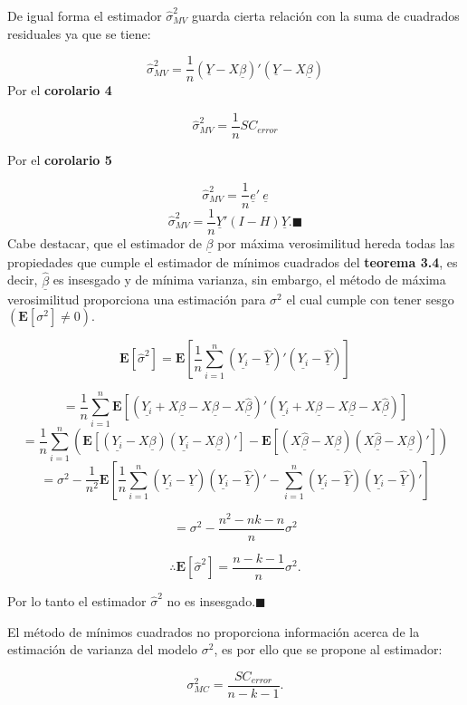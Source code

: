 \documentclass[
  a4paper,
  oneside,
  openany]{book}
\begin{document}
De igual forma el estimador \(\hat{\sigma}^2_{MV}\) guarda cierta relación con la suma de cuadrados residuales ya que se tiene:

\[\hat{\sigma}^2_{MV}=\frac{1}{n}(\underline{Y}-X\underline{\beta})'(\underline{Y}-X\underline{\beta})\]
Por el \textbf{corolario 4}

\[\hat{\sigma}^2_{MV}=\frac{1}{n}SC_{error}\]

Por el \textbf{corolario 5}

\[\hat{\sigma}^2_{MV}=\frac{1}{n}\underline{e}' \ \underline{e}\]
\[\hat{\sigma}^2_{MV}=\frac{1}{n}\underline{Y}'(I-H)\underline{Y}. \blacksquare \]
Cabe destacar, que el estimador de \(\underline{\beta}\) por máxima verosimilitud hereda todas las propiedades que cumple el estimador de mínimos cuadrados del \textbf{teorema 3.4}, es decir, \(\underline{\hat{\beta}}\) es insesgado y de mínima varianza, sin embargo, el método de máxima verosimilitud proporciona una estimación para \(\sigma^2\) el cual cumple con tener sesgo \((\mathbf{E}[\sigma^2]\neq 0).\)

\[\mathbf{E}[\hat{\sigma}^2]=\mathbf{E}\left[\frac{1}{n}\sum_{i=1}^{n}(\underline{Y_{i}}-\underline{\hat{Y}})'(\underline{Y_{i}}-\underline{\hat{Y}}) \right]\]

\[=\frac{1}{n}\sum_{i=1}^{n}\mathbf{E}\left[(\underline{Y_{i}}+X\underline{\beta}-X\underline{\beta}-X\underline{\hat{\beta}})'(\underline{Y_{i}}+X\underline{\beta}-X\underline{\beta}-X\underline{\hat{\beta}}) \right]\]
\[=\frac{1}{n}\sum_{i=1}^{n}\left(\mathbf{E}[(\underline{Y_{i}}-X\underline{\beta})(\underline{Y_{i}}-X\underline{\beta})']-\mathbf{E}\left[(X\underline{\hat{\beta}}-X\underline{\beta})(X\underline{\hat{\beta}}-X\underline{\beta})'\right] \right)\]
\[=\sigma^2-\frac{1}{n^2}\mathbf{E}\left[\frac{1}{n}\sum_{i=1}^{n}(\underline{Y_{i}}-\underline{\hat{Y}})(\underline{Y_{i}}-\underline{\hat{Y}})'-\sum_{i=1}^{n}(\underline{Y_{i}}-\underline{\hat{Y}})(\underline{Y_{i}}-\underline{\hat{Y}})'\right]\]

\[=\sigma^2-\frac{n^2-nk-n}{n}\sigma^2\]

\[\therefore \mathbf{E}[\hat{\sigma}^2]=\frac{n-k-1}{n}\sigma^2. \]

Por lo tanto el estimador \(\hat{\sigma}^2\) no es insesgado.\(\blacksquare\)

El método de mínimos cuadrados no proporciona información acerca de la estimación de varianza del modelo \(\sigma^2\), es por ello que se propone al estimador:

\[\sigma^2_{MC}=\frac{SC_{error}}{n-k-1}.\]
\end{document}
